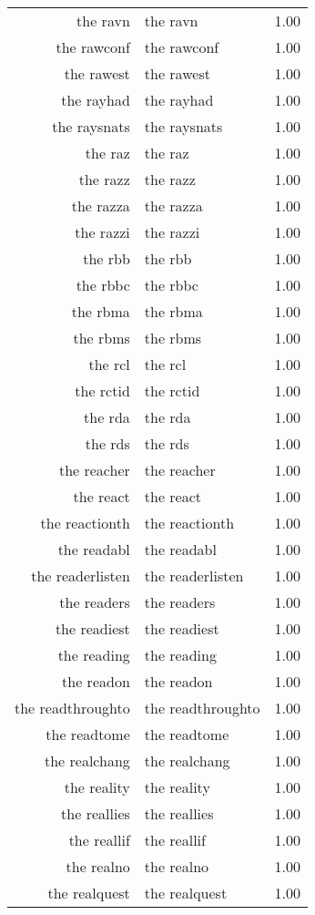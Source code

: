 \begin{table}[ht]
\begin{tabular}{rlr}
  the ravn & the ravn & 1.00 \\ 
  the rawconf & the rawconf & 1.00 \\ 
  the rawest & the rawest & 1.00 \\ 
  the rayhad & the rayhad & 1.00 \\ 
  the raysnats & the raysnats & 1.00 \\ 
  the raz & the raz & 1.00 \\ 
  the razz & the razz & 1.00 \\ 
  the razza & the razza & 1.00 \\ 
  the razzi & the razzi & 1.00 \\ 
  the rbb & the rbb & 1.00 \\ 
  the rbbc & the rbbc & 1.00 \\ 
  the rbma & the rbma & 1.00 \\ 
  the rbms & the rbms & 1.00 \\ 
  the rcl & the rcl & 1.00 \\ 
  the rctid & the rctid & 1.00 \\ 
  the rda & the rda & 1.00 \\ 
  the rds & the rds & 1.00 \\ 
  the reacher & the reacher & 1.00 \\ 
  the react & the react & 1.00 \\ 
  the reactionth & the reactionth & 1.00 \\ 
  the readabl & the readabl & 1.00 \\ 
  the readerlisten & the readerlisten & 1.00 \\ 
  the readers & the readers & 1.00 \\ 
  the readiest & the readiest & 1.00 \\ 
  the reading & the reading & 1.00 \\ 
  the readon & the readon & 1.00 \\ 
  the readthroughto & the readthroughto & 1.00 \\ 
  the readtome & the readtome & 1.00 \\ 
  the realchang & the realchang & 1.00 \\ 
  the reality & the reality & 1.00 \\ 
  the reallies & the reallies & 1.00 \\ 
  the reallif & the reallif & 1.00 \\ 
  the realno & the realno & 1.00 \\ 
  the realquest & the realquest & 1.00 \\ 

\end{tabular}
\end{table}
